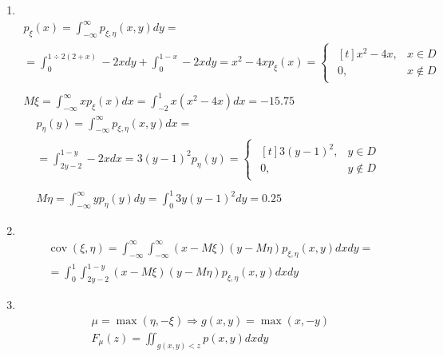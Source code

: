 \documentclass[12pt]{article}
\DeclareMathOperator{\cov}{cov}
\begin{document}
\begin{enumerate}
	\item \mbox{}\\
	      \begin{gather*}
		      p_{\xi}(x) = \int_{-\infty}^{\infty}p_{\xi,\eta}(x,y)dy = \\
		      = \int_{0}^{1\div2(2+x)}-2xdy + \int_{0}^{1-x}-2xdy = x^2 - 4x
		      p_{\xi}(x) =
		      \begin{cases}
			      \begin{aligned}[t]
				      x^2-4x, & x \in D    \\
				      0,      & x \notin D
			      \end{aligned}
		      \end{cases} \\\\
		      M\xi = \int_{-\infty}^{\infty}xp_{\xi}(x)dx = \int_{-2}^{1}x(x^2 - 4x)dx = -15.75
	      \end{gather*}
	      \begin{gather*}
		      p_{\eta}(y) = \int_{-\infty}^{\infty}p_{\xi,\eta}(x,y)dx = \\
		      = \int_{2y - 2}^{1 - y}-2xdx = 3(y - 1)^2
		      p_{\eta}(y) =
		      \begin{cases}
			      \begin{aligned}[t]
				      3(y - 1)^2, & y \in D    \\
				      0,          & y \notin D
			      \end{aligned}
		      \end{cases} \\\\
		      M\eta = \int_{-\infty}^{\infty}yp_{\eta}(y)dy = \int_{0}^{1}3y(y - 1)^2dy = 0.25
	      \end{gather*}

	\item \mbox{}\\
	      \begin{gather*}
		      \cov(\xi, \eta) = \int_{-\infty}^{\infty}\int_{-\infty}^{\infty}(x - M\xi)(y - M\eta)p_{\xi,\eta}(x,y)dxdy = \\
		      = \int_{0}^{1}\int_{2y-2}^{1-y}(x - M\xi)(y - M\eta)p_{\xi,\eta}(x,y)dxdy
	      \end{gather*}

	\item \mbox{}\\
	      \begin{gather*}
		      \mu = \max(\eta, -\xi) \Rightarrow g(x, y) = \max(x, -y) \\
		      F_{\mu}(z) = \iint_{g(x, y) < z} p(x,y)dxdy
	      \end{gather*}

\end{enumerate}
\end{document}
